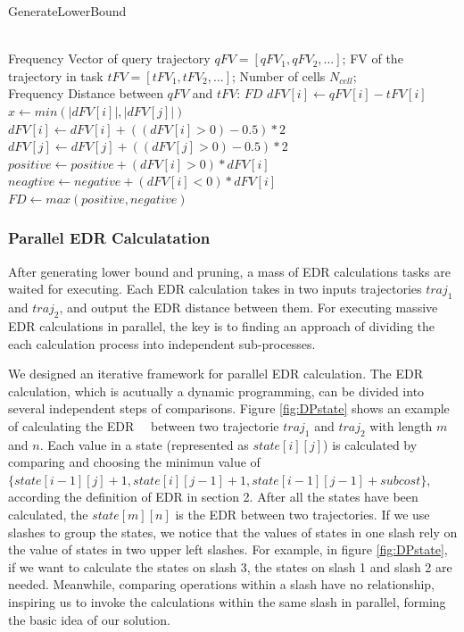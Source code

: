 \documentclass[conference]{IEEEtran}
\begin{document}
\begin{algorithm}[htb]
	\caption{GenerateLowerBound}
	\label{alg:GetLB}
	\begin{algorithmic}[1]
		\REQUIRE ~~\\
		Frequency Vector of query trajectory $qFV=[qFV_{1},qFV_{2},...]$; FV of the trajectory in task $tFV=[tFV_{1},tFV_{2},...]$; Number of cells $N_{cell}$;
		\ENSURE ~~\\
		Frequency Distance between $qFV$ and $tFV$: $FD$
		\STATE $dFV[i] \leftarrow qFV[i]-tFV[i]$
		\ENDFOR
		\STATE $x \leftarrow min(|dFV[i]|,|dFV[j]|)$
		\STATE $dFV[i] \leftarrow dFV[i] + ((dFV[i]>0)-0.5)*2$
		\STATE $dFV[j] \leftarrow dFV[j] + ((dFV[j]>0)-0.5)*2$
		\ENDIF
		\ENDFOR
		\ENDFOR
		\STATE $positive \leftarrow positive+(dFV[i]>0)*dFV[i]$
		\STATE $neagtive \leftarrow negative+(dFV[i]<0)*dFV[i]$
		\ENDFOR
		\STATE $FD \leftarrow max(positive,negative)$
	\end{algorithmic}
\end{algorithm}

\subsubsection{Parallel EDR Calculatation}
After generating lower bound and pruning, a mass of EDR calculations tasks are waited for executing. Each EDR calculation takes in two inputs trajectories $traj_1$ and $traj_2$, and output the EDR distance between them. For executing massive EDR calculations in parallel, the key is to finding an approach of dividing the each calculation process into independent sub-processes.  

We designed an iterative framework for parallel EDR calculation. The EDR calculation, which is acutually a dynamic programming, can be divided into several independent steps of comparisons. Figure \ref{fig:DPstate} shows an example of calculating the EDR 　between two trajectorie $traj_1$ and $traj_2$ with length $m$ and $n$. Each value in a state (represented as $state[i][j]$) is calculated by comparing and choosing the minimun value of $\{state[i-1][j]+1,state[i][j-1]+1,state[i-1][j-1]+subcost\}$, according the definition of EDR in section 2. After all the states have been calculated, the $state[m][n]$ is the EDR between two trajectories. If we use slashes to group the states, we notice that the values of states in one slash rely on the value of states in two upper left slashes. For example, in figure \ref{fig:DPstate}, if we want to calculate the states on slash 3, the states on slash 1 and slash 2 are needed. Meanwhile, comparing operations within a slash have no relationship, inspiring us to invoke the calculations within the same slash in parallel, forming the basic idea of our solution.
\end{document}
